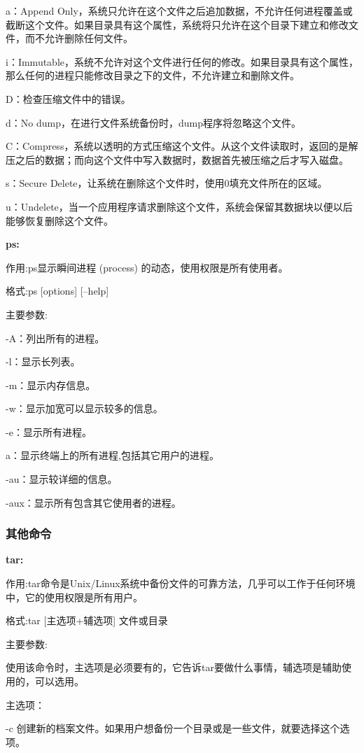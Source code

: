 a：Append Only，系统只允许在这个文件之后追加数据，不允许任何进程覆盖或截断这个文件。如果目录具有这个属性，系统将只允许在这个目录下建立和修改文件，而不允许删除任何文件。

i：Immutable，系统不允许对这个文件进行任何的修改。如果目录具有这个属性，那么任何的进程只能修改目录之下的文件，不允许建立和删除文件。

D：检查压缩文件中的错误。

d：No dump，在进行文件系统备份时，dump程序将忽略这个文件。

C：Compress，系统以透明的方式压缩这个文件。从这个文件读取时，返回的是解压之后的数据；而向这个文件中写入数据时，数据首先被压缩之后才写入磁盘。

s：Secure Delete，让系统在删除这个文件时，使用0填充文件所在的区域。

u：Undelete，当一个应用程序请求删除这个文件，系统会保留其数据块以便以后能够恢复删除这个文件。

\textbf{ps:}

作用:ps显示瞬间进程 (process) 的动态，使用权限是所有使用者。

格式:ps [options] [--help]

主要参数:

-A：列出所有的进程。

-l：显示长列表。

-m：显示内存信息。

-w：显示加宽可以显示较多的信息。

-e：显示所有进程。

a：显示终端上的所有进程,包括其它用户的进程。

-au：显示较详细的信息。

-aux：显示所有包含其它使用者的进程。

\subsubsection{其他命令}

\textbf{tar:}

作用:tar命令是Unix/Linux系统中备份文件的可靠方法，几乎可以工作于任何环境中，它的使用权限是所有用户。

格式:tar [主选项+辅选项] 文件或目录

主要参数:

使用该命令时，主选项是必须要有的，它告诉tar要做什么事情，辅选项是辅助使用的，可以选用。

主选项：

-c 创建新的档案文件。如果用户想备份一个目录或是一些文件，就要选择这个选项。

